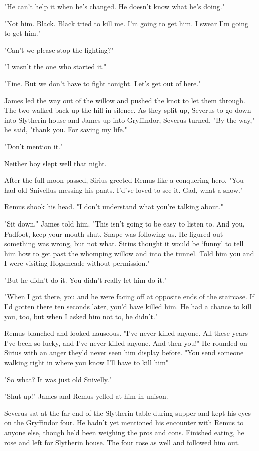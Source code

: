 "He can't help it when he's changed. He doesn't know what he's doing."

"Not him. Black. Black tried to kill me. I'm going to get him. I swear I'm going to get him."

"Can't we please stop the fighting?"

"I wasn't the one who started it."

"Fine. But we don't have to fight tonight. Let's get out of here."

James led the way out of the willow and pushed the knot to let them through. The two walked back up the hill in silence. As they split up, Severus to go down into Slytherin house and James up into Gryffindor, Severus turned. "By the way," he said, "thank you. For saving my life."

"Don't mention it."

Neither boy slept well that night.

After the full moon passed, Sirius greeted Remus like a conquering hero. "You had old Snivellus messing his pants. I'd've loved to see it. Gad, what a show."

Remus shook his head. "I don't understand what you're talking about."

"Sit down," James told him. "This isn't going to be easy to listen to. And you, Padfoot, keep your mouth shut. Snape was following us. He figured out something was wrong, but not what. Sirius thought it would be `funny' to tell him how to get past the whomping willow and into the tunnel. Told him you and I were visiting Hogsmeade without permission."

"But he didn't do it. You didn't really let him do it."

"When I got there, you and he were facing off at opposite ends of the staircase. If I'd gotten there ten seconds later, you'd have killed him. He had a chance to kill you, too, but when I asked him not to, he didn't."

Remus blanched and looked nauseous. "I've never killed anyone. All these years I've been so lucky, and I've never killed anyone. And then you!" He rounded on Sirius with an anger they'd never seen him display before. "You send someone walking right in where you know I'll have to kill him{\el}"

"So what? It was just old Snivelly."

"Shut up!" James and Remus yelled at him in unison.

Severus sat at the far end of the Slytherin table during supper and kept his eyes on the Gryffindor four. He hadn't yet mentioned his encounter with Remus to anyone else, though he'd been weighing the pros and cons. Finished eating, he rose and left for Slytherin house. The four rose as well and followed him out.


